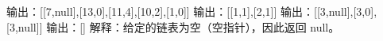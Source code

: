 输出：[[7,null],[13,0],[11,4],[10,2],[1,0]]
输出：[[1,1],[2,1]]
输出：[[3,null],[3,0],[3,null]]
输出：[]
解释：给定的链表为空（空指针），因此返回 null。
